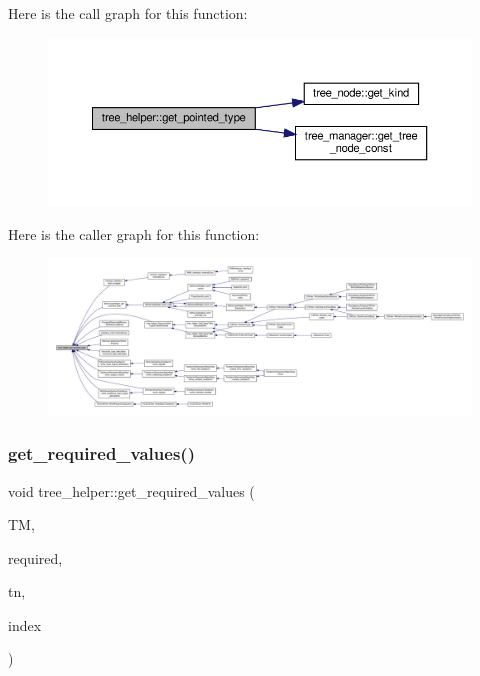 Here is the call graph for this function\+:
\nopagebreak
\begin{figure}[H]
\begin{center}
\leavevmode
\includegraphics[width=350pt]{d7/d99/classtree__helper_a44773dce45000b8e7283c452ff972dc1_cgraph}
\end{center}
\end{figure}
Here is the caller graph for this function\+:
\nopagebreak
\begin{figure}[H]
\begin{center}
\leavevmode
\includegraphics[width=350pt]{d7/d99/classtree__helper_a44773dce45000b8e7283c452ff972dc1_icgraph}
\end{center}
\end{figure}
\mbox{\label{classtree__helper_ac6e0286958beccf450e505d7c56fef6f}} 
\subsubsection{\texorpdfstring{get\+\_\+required\+\_\+values()}{get\_required\_values()}}
{\footnotesize\ttfamily void tree\+\_\+helper\+::get\+\_\+required\+\_\+values (\begin{DoxyParamCaption}\item[{const \hyperlink{tree__manager_8hpp_a792e3f1f892d7d997a8d8a4a12e39346}{tree\+\_\+manager\+Const\+Ref} \&}]{TM,  }\item[{std\+::vector$<$ std\+::tuple$<$ unsigned int, unsigned int $>$$>$ \&}]{required,  }\item[{const \hyperlink{tree__node_8hpp_a6ee377554d1c4871ad66a337eaa67fd5}{tree\+\_\+node\+Ref} \&}]{tn,  }\item[{unsigned int}]{index }\end{DoxyParamCaption})\hspace{0.3cm}{\ttfamily [static]}}

